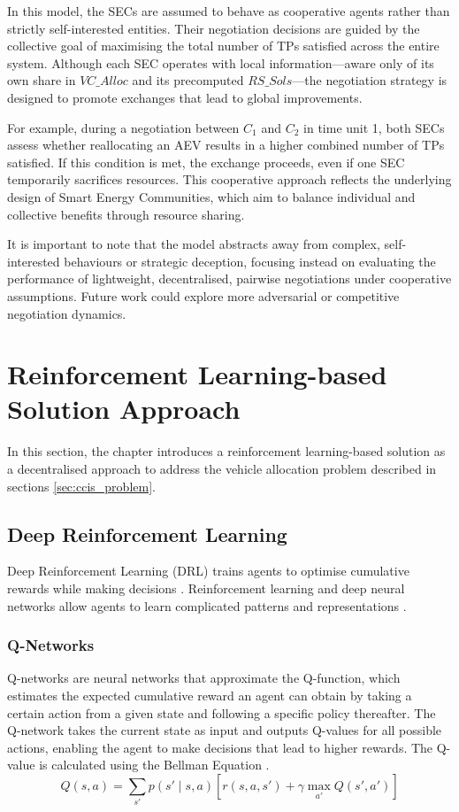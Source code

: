 In this model, the SECs are assumed to behave as cooperative agents rather than strictly self-interested entities. Their negotiation decisions are guided by the collective goal of maximising the total number of TPs satisfied across the entire system. Although each SEC operates with local information—aware only of its own share in $VC\_Alloc$ and its precomputed $RS\_Sols$—the negotiation strategy is designed to promote exchanges that lead to global improvements.

For example, during a negotiation between $C_1$ and $C_2$ in time unit 1, both SECs assess whether reallocating an AEV results in a higher combined number of TPs satisfied. If this condition is met, the exchange proceeds, even if one SEC temporarily sacrifices resources. This cooperative approach reflects the underlying design of Smart Energy Communities, which aim to balance individual and collective benefits through resource sharing.

It is important to note that the model abstracts away from complex, self-interested behaviours or strategic deception, focusing instead on evaluating the performance of lightweight, decentralised, pairwise negotiations under cooperative assumptions. Future work could explore more adversarial or competitive negotiation dynamics.


\section{Reinforcement Learning-based Solution Approach}
\label{ccis_reinforcement_learning_solution_approach}

In this section, the chapter introduces a reinforcement learning-based solution as a decentralised approach to address the vehicle allocation problem \cite{Reference301} described in sections \ref{sec:ccis_problem}. 

\subsection{Deep Reinforcement Learning}
Deep Reinforcement Learning (DRL) trains agents to optimise cumulative rewards while making decisions \cite{Reference501}. Reinforcement learning and deep neural networks allow agents to learn complicated patterns and representations \cite{Reference501}.

\subsubsection{Q-Networks}
Q-networks are neural networks that approximate the Q-function, which estimates the expected cumulative reward an agent can obtain by taking a certain action from a given state and following a specific policy thereafter. The Q-network takes the current state as input and outputs Q-values for all possible actions, enabling the agent to make decisions that lead to higher rewards. The Q-value is calculated using the Bellman Equation \cite{Reference501}. 
\[
Q(s, a) = \sum_{s'} p(s' \mid s, a) \left[ r(s, a, s') + \gamma \max_{a'} Q(s', a') \right]
\]

